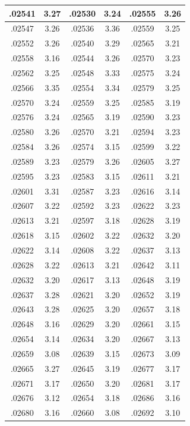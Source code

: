 \documentclass[10pt,twoside]{report}
\begin{document}
\begin{appendices}
\begin{longtable}{|c|c||c|c||c|c|}
.02541 & 3.27 & .02530 & 3.24 & .02555 & 3.26\\\hline
.02547 & 3.26 & .02536 & 3.36 & .02559 & 3.25\\\hline
.02552 & 3.26 & .02540 & 3.29 & .02565 & 3.21\\\hline
.02558 & 3.16 & .02544 & 3.26 & .02570 & 3.23\\\hline
.02562 & 3.25 & .02548 & 3.33 & .02575 & 3.24\\\hline
.02566 & 3.35 & .02554 & 3.34 & .02579 & 3.25\\\hline
.02570 & 3.24 & .02559 & 3.25 & .02585 & 3.19\\\hline
.02576 & 3.24 & .02565 & 3.19 & .02590 & 3.23\\\hline
.02580 & 3.26 & .02570 & 3.21 & .02594 & 3.23\\\hline
.02584 & 3.26 & .02574 & 3.15 & .02599 & 3.22\\\hline
.02589 & 3.23 & .02579 & 3.26 & .02605 & 3.27\\\hline
.02595 & 3.23 & .02583 & 3.15 & .02611 & 3.21\\\hline
.02601 & 3.31 & .02587 & 3.23 & .02616 & 3.14\\\hline
.02607 & 3.22 & .02592 & 3.23 & .02622 & 3.23\\\hline
.02613 & 3.21 & .02597 & 3.18 & .02628 & 3.19\\\hline
.02618 & 3.15 & .02602 & 3.22 & .02632 & 3.20\\\hline
.02622 & 3.14 & .02608 & 3.22 & .02637 & 3.13\\\hline
.02628 & 3.22 & .02613 & 3.21 & .02642 & 3.11\\\hline
.02632 & 3.20 & .02617 & 3.13 & .02648 & 3.19\\\hline
.02637 & 3.28 & .02621 & 3.20 & .02652 & 3.19\\\hline
.02643 & 3.28 & .02625 & 3.20 & .02657 & 3.18\\\hline
.02648 & 3.16 & .02629 & 3.20 & .02661 & 3.15\\\hline
.02654 & 3.14 & .02634 & 3.20 & .02667 & 3.13\\\hline
.02659 & 3.08 & .02639 & 3.15 & .02673 & 3.09\\\hline
.02665 & 3.27 & .02645 & 3.19 & .02677 & 3.17\\\hline
.02671 & 3.17 & .02650 & 3.20 & .02681 & 3.17\\\hline
.02676 & 3.12 & .02654 & 3.18 & .02686 & 3.16\\\hline
.02680 & 3.16 & .02660 & 3.08 & .02692 & 3.10\\\hline

\end{longtable}
\end{appendices}
\end{document}

